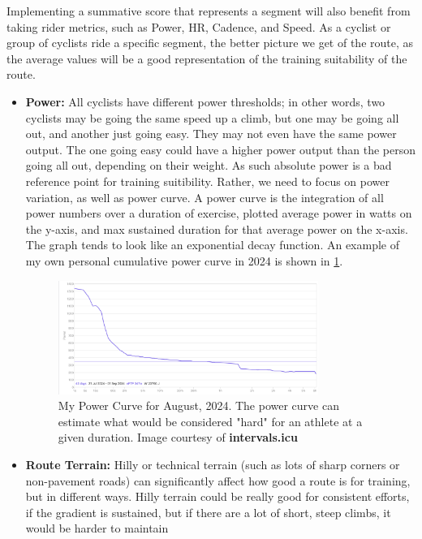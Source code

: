 \documentclass[11pt,twoside]{report}
\begin{document}
Implementing a summative score that represents a segment will also benefit from taking rider metrics, such as Power, HR, Cadence, and Speed.
As a cyclist or group of cyclists ride a specific segment, the better picture we get of the route, as the average values will be a good representation
of the training suitability of the route.
\begin{itemize}
	\item \textbf{Power:} All cyclists have different power thresholds; in other words, two cyclists may be going the same speed up a climb, but one may be going all out, and another just going easy.
	      They may not even have the same power output. The one going easy could have a higher power output than the person going all out, depending on their weight. As such absolute power is a bad reference
	      point for training suitibility. Rather, we need to focus on power variation, as well as power curve. A power curve is the integration of all power numbers over a duration of exercise, plotted average power in watts on the y-axis,
	      and max sustained duration for that average power on the x-axis. The graph tends to look like an exponential decay function. An example of my own personal cumulative power curve in 2024 is shown in \ref{fig:jibb_powercurve}.
	      \begin{figure}[htbp!]
		      \centering
		      \includegraphics[width=0.8\textwidth]{jibb_powercurve.png}
		      \caption{My Power Curve for August, 2024. The power curve can estimate what would be considered "hard" for an athlete at a given duration. Image courtesy of \textbf{intervals.icu}}
		      \label{fig:jibb_powercurve}
	      \end{figure}
	\item \textbf{Route Terrain:} Hilly or technical terrain (such as lots of sharp corners or non-pavement roads) can significantly affect how good a route is for training, but
	      in different ways. Hilly terrain could be really good for consistent efforts, if the gradient is sustained, but if there are a lot of short, steep climbs, it would be harder to maintain

\end{itemize}
\end{document}
